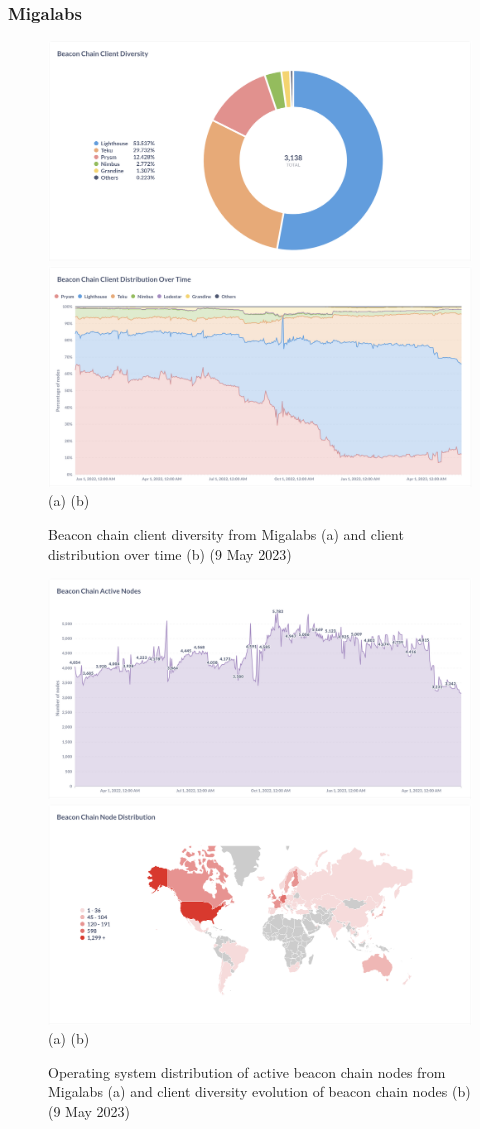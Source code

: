 \documentclass[UTF8]{article}
\begin{document}
{\subsubsection*{Migalabs}
 \begin{figure}[htbp]
\begin{center}
\includegraphics[width=0.48\linewidth]{images/clientdiversity}
\includegraphics[width=0.48\linewidth]{images/architecture} \\
(a)\hspace{160pt}        (b)\\
\caption{Beacon chain client diversity from Migalabs (a) and client distribution over time (b) (9 May 2023)}
\label{fig:diversity}
\end{center}
\end{figure}

\begin{figure}[htbp]
\begin{center}
\includegraphics[width=0.48\linewidth]{images/activenodes}
\includegraphics[width=0.48\linewidth]{images/evolution} \\
(a)\hspace{160pt}        (b)\\
\caption{Operating system distribution of active beacon chain nodes from Migalabs (a) and client diversity evolution of beacon chain nodes (b) (9 May 2023)}
\label{fig:active}
\end{center}
\end{figure}

}
\end{document}
